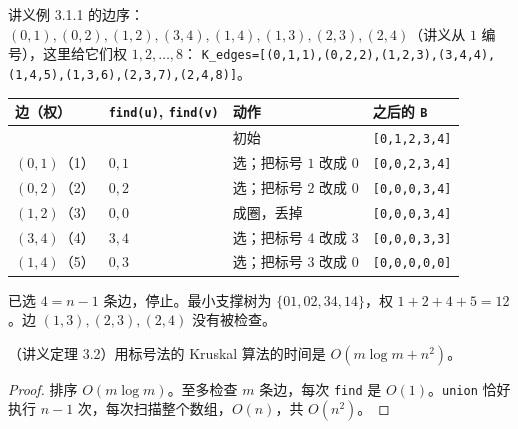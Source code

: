 \begin{example}\label{ex:mst-kruskal:run}
讲义例 3.1.1 的边序：$(0,1),(0,2),(1,2),(3,4),(1,4),(1,3),(2,3),(2,4)$（讲义从 $1$ 编号），这里给它们权 $1,2,\dots,8$：
\texttt{K\_edges=[(0,1,1),(0,2,2),(1,2,3),(3,4,4),(1,4,5),(1,3,6),(2,3,7),(2,4,8)]}。
\begin{center}
\end{center}
\begin{center}
\small
\begin{tabular}{llll}
\toprule
边（权） & \texttt{find(u)}, \texttt{find(v)} & 动作 & 之后的 \texttt{B} \\
\midrule
& & 初始 & \texttt{[0,1,2,3,4]} \\
$(0,1)$（1） & $0,1$ & 选；把标号 $1$ 改成 $0$ & \texttt{[0,0,2,3,4]} \\
$(0,2)$（2） & $0,2$ & 选；把标号 $2$ 改成 $0$ & \texttt{[0,0,0,3,4]} \\
$(1,2)$（3） & $0,0$ & 成圈，丢掉 & \texttt{[0,0,0,3,4]} \\
$(3,4)$（4） & $3,4$ & 选；把标号 $4$ 改成 $3$ & \texttt{[0,0,0,3,3]} \\
$(1,4)$（5） & $0,3$ & 选；把标号 $3$ 改成 $0$ & \texttt{[0,0,0,0,0]} \\
\bottomrule
\end{tabular}
\end{center}
已选 $4=n-1$ 条边，停止。最小支撑树为 $\{01,02,34,14\}$，权 $1+2+4+5=12$。边 $(1,3),(2,3),(2,4)$ 没有被检查。
\end{example}

\begin{theorem}\label{thm:mst-kruskal:label-time}
（讲义定理 3.2）用标号法的 Kruskal 算法的时间是 $O(m\log m+n^2)$。
\end{theorem}
\begin{proof}
排序 $O(m\log m)$。至多检查 $m$ 条边，每次 \texttt{find} 是 $O(1)$。\texttt{union} 恰好执行 $n-1$ 次，每次扫描整个数组，$O(n)$，共 $O(n^2)$。
\end{proof}

